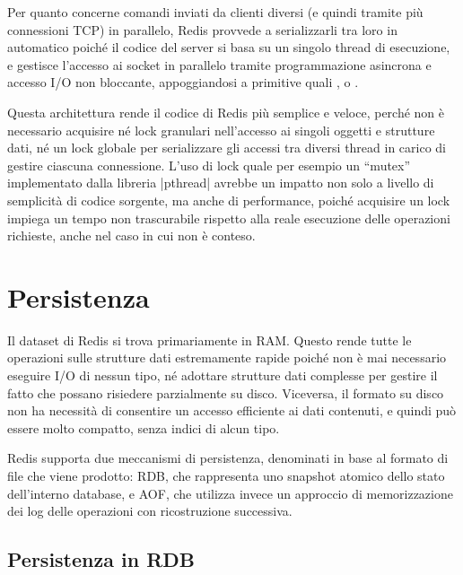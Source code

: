 Per quanto concerne comandi inviati da clienti diversi (e quindi tramite più connessioni TCP) in
parallelo, Redis provvede a serializzarli tra loro in automatico poiché il codice del server si
basa su un singolo thread di esecuzione, e gestisce l'accesso ai socket in parallelo tramite
programmazione asincrona e accesso I/O non bloccante, appoggiandosi a primitive quali 
,
 o 
.

Questa architettura rende il codice di Redis più semplice e veloce, perché non è necessario
acquisire né lock granulari nell'accesso ai singoli oggetti e strutture dati, né un lock globale per
serializzare gli accessi tra diversi thread in carico di gestire ciascuna connessione. L'uso di lock
quale per esempio un ``mutex'' implementato dalla libreria \cverb|pthread| avrebbe un impatto non
solo a livello di semplicità di codice sorgente, ma anche di performance, poiché acquisire un lock
impiega un tempo non trascurabile rispetto alla reale esecuzione delle operazioni richieste, anche
nel caso in cui non è conteso.

\section{Persistenza}
\label{sec:persistence}

Il dataset di Redis si trova primariamente in RAM. Questo rende tutte le operazioni sulle strutture
dati estremamente rapide poiché non è mai necessario eseguire I/O di nessun tipo, né adottare
strutture dati complesse per gestire il fatto che possano risiedere parzialmente su disco.
Viceversa, il formato su disco non ha necessità di consentire un accesso efficiente ai dati
contenuti, e quindi può essere molto compatto, senza indici di alcun tipo.

Redis supporta due meccanismi di persistenza, denominati in base al formato di file che viene
prodotto: RDB, che rappresenta uno snapshot atomico dello stato dell'interno database, e AOF, che
utilizza invece un approccio di memorizzazione dei log delle operazioni con ricostruzione
successiva.

\subsection{Persistenza in RDB}

